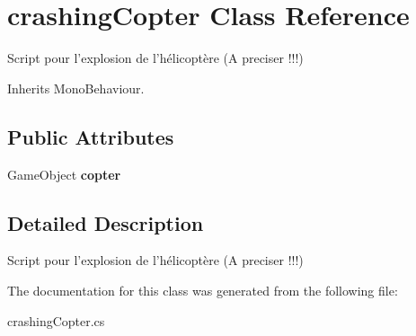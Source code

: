 \hypertarget{classcrashing_copter}{\section{crashing\+Copter Class Reference}
\label{classcrashing_copter}
}


Script pour l'explosion de l'hélicoptère (A preciser !!!)  




Inherits Mono\+Behaviour.

\subsection*{Public Attributes}
\begin{DoxyCompactItemize}
\item 
\hypertarget{classcrashing_copter_a03f780a707a5626302d50ab3f245dabf}{Game\+Object {\bfseries copter}}\label{classcrashing_copter_a03f780a707a5626302d50ab3f245dabf}

\end{DoxyCompactItemize}


\subsection{Detailed Description}
Script pour l'explosion de l'hélicoptère (A preciser !!!) 



The documentation for this class was generated from the following file\+:\begin{DoxyCompactItemize}
\item 
crashing\+Copter.\+cs\end{DoxyCompactItemize}
